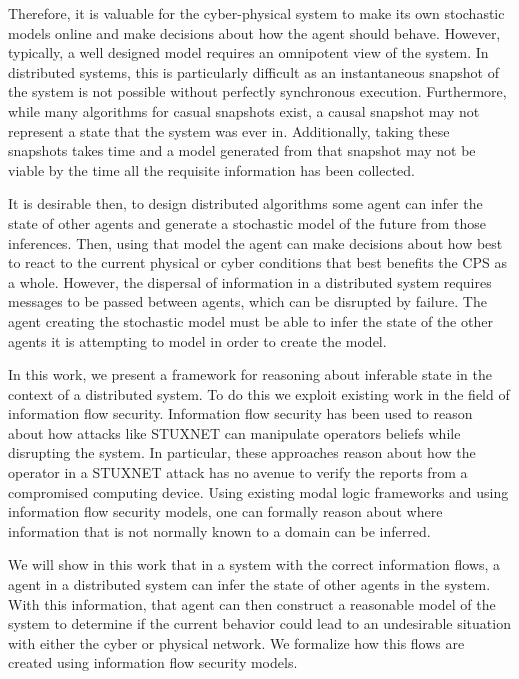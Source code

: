 Therefore, it is valuable for the cyber-physical system to make its own stochastic models online and make decisions about how the agent should behave. However, typically, a well designed model requires an omnipotent view of the system. In distributed systems, this is particularly difficult as an instantaneous snapshot of the system is not possible without perfectly synchronous execution. Furthermore, while many algorithms for casual snapshots exist, a causal snapshot may not represent a state that the system was ever in. Additionally, taking these snapshots takes time and a model generated from that snapshot may not be viable by the time all the requisite information has been collected.

It is desirable then, to design distributed algorithms some agent can infer the state of other agents and generate a stochastic model of the future from those inferences. Then, using that model the agent can make decisions about how best to react to the current physical or cyber conditions that best benefits the CPS as a whole. However, the dispersal of information in a distributed system requires messages to be passed between agents, which can be disrupted by failure. The agent creating the stochastic model must be able to infer the state of the other agents it is attempting to model in order to create the model.

In this work, we present a framework for reasoning about inferable state in the context of a distributed system. To do this we exploit existing work in the field of information flow security. Information flow security has been used to reason about how attacks like STUXNET can manipulate operators beliefs while disrupting the system. In particular, these approaches reason about how the operator in a STUXNET attack has no avenue to verify the reports from a compromised computing device. Using existing modal logic frameworks and using information flow security models, one can formally reason about where information that is not normally known to a domain can be inferred.

We will show in this work that in a system with the correct information flows, a agent in a distributed system can infer the state of other agents in the system. With this information, that agent can then construct a reasonable model of the system to determine if the current behavior could lead to an undesirable situation with either the cyber or physical network. We formalize how this flows are created using information flow security models.

